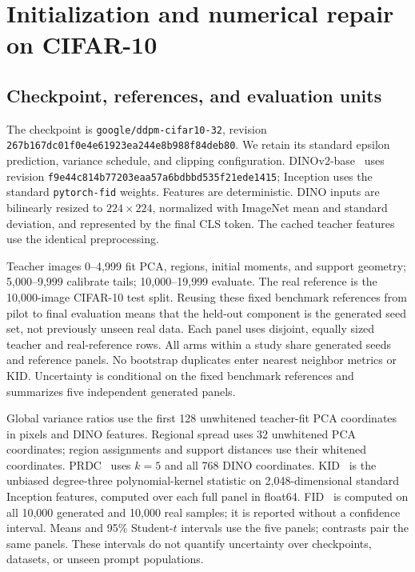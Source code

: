 \section{Initialization and numerical repair on CIFAR-10}
\label{supp:cifar}

\subsection{Checkpoint, references, and evaluation units}
The checkpoint is \texttt{google/ddpm-cifar10-32}, revision
\texttt{267b167dc01f0e4e6192\allowbreak{}3ea244e8b988f84deb80}. We retain its standard
epsilon prediction, variance schedule, and clipping configuration.
DINOv2-base~\cite{oquab2024dinov2} uses revision
\texttt{f9e44c814b77203eaa57\allowbreak{}a6bdbbd535f21ede1415}; Inception uses the standard
\texttt{pytorch-fid} weights. Features are deterministic. DINO inputs are
bilinearly resized to $224\times224$, normalized with ImageNet mean and
standard deviation, and represented by the final CLS token. The cached
teacher features use the identical preprocessing.

Teacher images 0--4,999 fit PCA, regions, initial moments, and support geometry;
5,000--9,999 calibrate tails; 10,000--19,999 evaluate. The real reference is
the 10,000-image CIFAR-10 test split. Reusing these fixed benchmark references
from pilot to final evaluation means that the held-out component is the
generated seed set, not previously unseen real data. Each panel uses disjoint,
equally sized teacher and real-reference rows. All arms within a study share
generated seeds and reference panels. No bootstrap duplicates enter nearest
neighbor metrics or KID. Uncertainty is conditional on the fixed benchmark
references and summarizes five independent generated panels.

Global variance ratios use the first 128 unwhitened teacher-fit PCA coordinates
in pixels and DINO features. Regional spread uses 32 unwhitened PCA coordinates;
region assignments and support distances use their whitened coordinates.
PRDC~\cite{naeem2020density} uses $k=5$ and all 768 DINO coordinates. KID~\cite{binkowski2018demystifying} is the
unbiased degree-three polynomial-kernel statistic on 2,048-dimensional standard
Inception features, computed over each full panel in float64. FID~\cite{heusel2017gans} is computed
on all 10,000 generated and 10,000 real samples; it is reported without a
confidence interval. Means and 95\% Student-$t$ intervals use the five panels;
contrasts pair the same panels. These intervals do not quantify uncertainty
over checkpoints, datasets, or unseen prompt populations.

